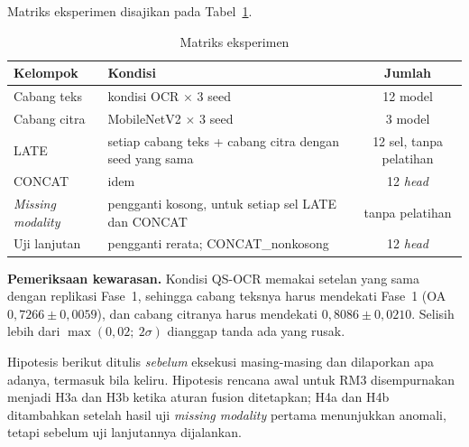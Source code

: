 Matriks eksperimen disajikan pada Tabel~\ref{tab:desain}.

\begin{table}[H]
  \centering
  \caption{Matriks eksperimen}
  \label{tab:desain}
  \fontsize{10}{12}\selectfont
  \begin{tabularx}{\textwidth}{|l|>{\raggedright\arraybackslash}X|c|}
    \hline
    \textbf{Kelompok} & \textbf{Kondisi} & \textbf{Jumlah} \\ \hline
    Cabang teks & 4 kondisi OCR $\times$ 3 seed & 12 model \\ \hline
    Cabang citra & MobileNetV2 $\times$ 3 seed & 3 model \\ \hline
    LATE & setiap cabang teks + cabang citra dengan seed yang sama & 12 sel, tanpa
    pelatihan \\ \hline
    CONCAT & idem & 12 \textit{head} \\ \hline
    \textit{Missing modality} & pengganti kosong, untuk setiap sel LATE dan CONCAT &
    tanpa pelatihan \\ \hline
    Uji lanjutan & pengganti rerata; CONCAT\_nonkosong & 12 \textit{head} \\ \hline
  \end{tabularx}
\end{table}

\textbf{Pemeriksaan kewarasan.} Kondisi QS-OCR memakai setelan yang sama dengan replikasi
Fase~1, sehingga cabang teksnya harus mendekati Fase~1 (OA $0{,}7266 \pm 0{,}0059$), dan
cabang citranya harus mendekati $0{,}8086 \pm 0{,}0210$. Selisih lebih dari
$\max(0{,}02;\ 2\sigma)$ dianggap tanda ada yang rusak.

Hipotesis berikut ditulis \emph{sebelum} eksekusi masing-masing dan dilaporkan apa
adanya, termasuk bila keliru. Hipotesis rencana awal untuk RM3 disempurnakan menjadi H3a
dan H3b ketika aturan fusion ditetapkan; H4a dan H4b ditambahkan setelah hasil uji
\textit{missing modality} pertama menunjukkan anomali, tetapi sebelum uji lanjutannya
dijalankan.

